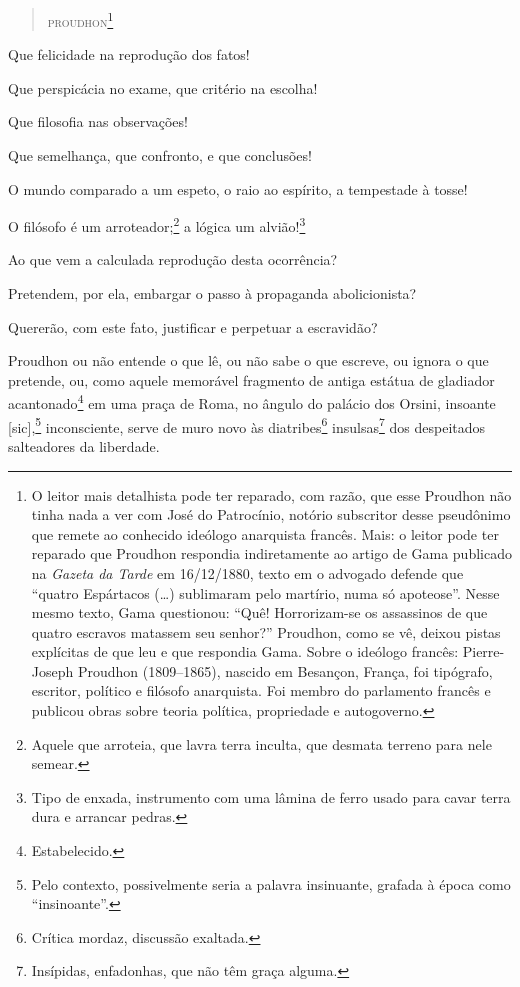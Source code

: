 \begin{quote}
\hfill\textsc{proudhon}\footnote{O leitor mais detalhista pode ter reparado, com razão, que esse Proudhon não tinha nada a ver com José do
  Patrocínio, notório subscritor desse pseudônimo que remete ao
  conhecido ideólogo anarquista francês. Mais: o leitor pode ter
  reparado que Proudhon respondia indiretamente ao artigo de Gama
  publicado na \emph{Gazeta da Tarde} em 16/12/1880, texto em o advogado
  defende que ``quatro Espártacos (\ldots{}) sublimaram pelo martírio, numa só
  apoteose''. Nesse mesmo texto, Gama questionou: ``Quê! Horrorizam-se os
  assassinos de que quatro escravos matassem seu senhor?''
  Proudhon, como se vê, deixou pistas explícitas de que leu e que
  respondia Gama. Sobre o ideólogo francês: Pierre-Joseph Proudhon \label{proudhon}
  (1809--1865), nascido em Besançon, França, foi tipógrafo, escritor,
  político e filósofo anarquista. Foi membro do parlamento francês e
  publicou obras sobre teoria política, propriedade e autogoverno.}
\end{quote}

\asterisc

Que felicidade na reprodução dos fatos!

Que perspicácia no exame, que critério na escolha!

Que filosofia nas observações!

Que semelhança, que confronto, e que conclusões!

O mundo comparado a um espeto, o raio ao espírito, a tempestade à tosse!

O filósofo é um arroteador;\footnote{Aquele que arroteia, que lavra
  terra inculta, que desmata terreno para nele semear.} a lógica um
alvião!\footnote{Tipo de enxada, instrumento com uma lâmina de ferro
  usado para cavar terra dura e arrancar pedras.}

Ao que vem a calculada reprodução desta ocorrência?

Pretendem, por ela, embargar o passo à propaganda abolicionista?

Quererão, com este fato, justificar e perpetuar a escravidão?

Proudhon ou não entende o que lê, ou não sabe o que escreve, ou
ignora o que pretende, ou, como aquele memorável fragmento de antiga
estátua de gladiador acantonado\footnote{Estabelecido.} em uma praça
de Roma, no ângulo do palácio dos Orsini, insoante {[}sic{]},\footnote{
  Pelo contexto, possivelmente seria a palavra insinuante, grafada à
  época como ``insinoante''.} inconsciente, serve de muro novo às
diatribes\footnote{Crítica mordaz, discussão exaltada.}
insulsas\footnote{Insípidas, enfadonhas, que não têm graça alguma.}
dos despeitados salteadores da liberdade.


